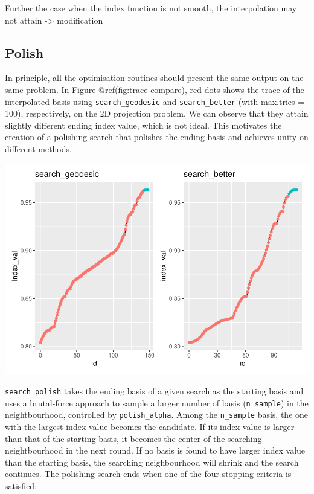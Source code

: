 \documentclass[12pt]{article}
\begin{document}
Further the case when the index function is not smooth, the
interpolation may not attain -\textgreater{} modification

\hypertarget{polish}{%
\subsection{Polish}\label{polish}}

In principle, all the optimisation routines should present the same
output on the same problem. In Figure @ref(fig:trace-compare), red dots
shows the trace of the interpolated basis using
\texttt{search\_geodesic} and \texttt{search\_better} (with max.tries =
100), respectively, on the 2D projection problem. We can observe that
they attain slightly different ending index value, which is not ideal.
This motivates the creation of a polishing search that polishes the
ending basis and achieves unity on different methods.

\includegraphics{paper_files/figure-latex/unnamed-chunk-10-1.pdf}

\texttt{search\_polish} takes the ending basis of a given search as the
starting basis and uses a brutal-force approach to sample a larger
number of basis (\texttt{n\_sample}) in the neightbourhood, controlled
by \texttt{polish\_alpha}. Among the \texttt{n\_sample} basis, the one
with the largest index value becomes the candidate. If its index value
is larger than that of the starting basis, it becomes the center of the
searching neightbourhood in the next round. If no basis is found to have
larger index value than the starting basis, the searching neighbourhood
will shrink and the search continues. The polishing search ends when one
of the four stopping criteria is satisfied:
\end{document}
